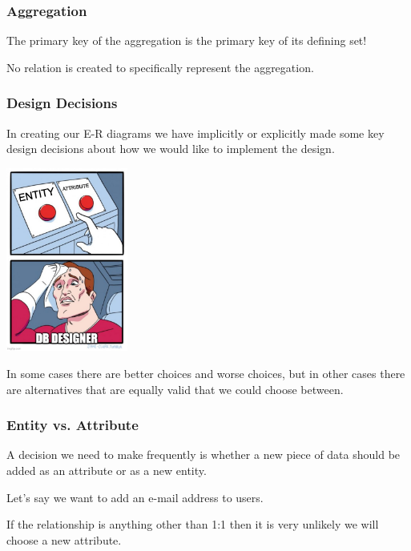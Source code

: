\begin{frame}
\frametitle{Aggregation}

The primary key of the aggregation is the primary key of its defining set!

No relation is created to specifically represent the aggregation.

\end{frame}





\begin{frame}
\frametitle{Design Decisions}

In creating our E-R diagrams we have implicitly or explicitly made some key design decisions about how we would like to implement the design. 

\begin{center}
	\includegraphics[width=0.3\textwidth]{images/e-a-choice.jpg}
\end{center}

In some cases there are better choices and worse choices, but in other cases there are alternatives that are equally valid that we could choose between.

\end{frame}



\begin{frame}
\frametitle{Entity vs. Attribute}

A decision we need to make frequently is whether a new piece of data should be added as an attribute or as a new entity. 
 
Let's say we want to add an e-mail address to users.

If the relationship is anything other than 1:1 then it is very unlikely we will choose a new attribute.

\end{frame}




